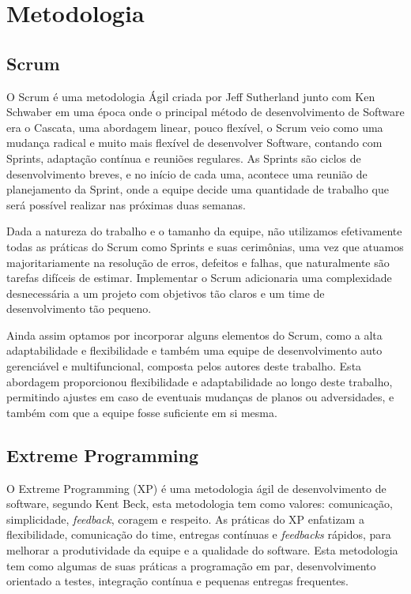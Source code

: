 \chapter[Metodologia]{Metodologia}

\section{Scrum}

O Scrum é uma metodologia Ágil criada por Jeff Sutherland junto com Ken Schwaber em uma época onde o principal método de desenvolvimento de Software era o Cascata, uma abordagem linear, pouco flexível, o Scrum veio como uma mudança radical e muito mais flexível de desenvolver Software, contando com Sprints, adaptação contínua e reuniões regulares.
As Sprints são ciclos de desenvolvimento breves, e no início de cada uma, acontece uma reunião de planejamento da Sprint, onde a equipe decide uma quantidade de trabalho que será possível realizar nas próximas duas semanas. \cite{shuterland2014}

Dada a natureza do trabalho e o tamanho da equipe, não utilizamos efetivamente todas as práticas do Scrum como Sprints e suas cerimônias, uma vez que atuamos majoritariamente na resolução de erros, defeitos e falhas, que naturalmente são tarefas difíceis de estimar. Implementar o Scrum adicionaria uma complexidade desnecessária a um projeto com objetivos tão claros e um time de desenvolvimento tão pequeno.

Ainda assim optamos por incorporar alguns elementos do Scrum, como a alta adaptabilidade e flexibilidade e também uma equipe de desenvolvimento auto gerenciável e multifuncional, composta pelos autores deste trabalho. Esta abordagem proporcionou flexibilidade e adaptabilidade ao longo deste trabalho, permitindo ajustes em caso de eventuais mudanças de planos ou adversidades, e também com que a equipe fosse suficiente em si mesma.

\section{Extreme Programming}
O Extreme Programming (XP) é uma metodologia ágil de desenvolvimento de software, segundo Kent Beck, esta metodologia tem como valores: comunicação, simplicidade, \textit{feedback}, coragem e respeito. As práticas do XP enfatizam a flexibilidade, comunicação do time, entregas contínuas e \textit{feedbacks} rápidos, para melhorar a produtividade da equipe e a qualidade do software. Esta metodologia tem como algumas de suas práticas a programação em par, desenvolvimento orientado a testes, integração contínua e pequenas entregas frequentes. \cite{kentbeck2014}

